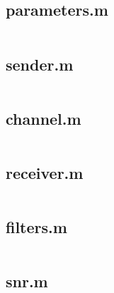 \documentclass[10pt, oneside, a4paper]{article}
\begin{document}
\subsection{parameters.m}
\inputminted{matlab}{../parameters.m}
\label{app:paremeters}

\subsection{sender.m}
\inputminted{matlab}{../sender.m}
\label{app:sender}

\subsection{channel.m}
\inputminted{matlab}{../channel.m}
\label{app:channel}

\subsection{receiver.m}
\inputminted{matlab}{../receiver.m}
\label{app:receiver}

\subsection{filters.m}
\inputminted{matlab}{../filters.m}
\label{app:filters}

\subsection{snr.m}
\inputminted{matlab}{../snr.m}
\label{app:snr}
\end{document}
